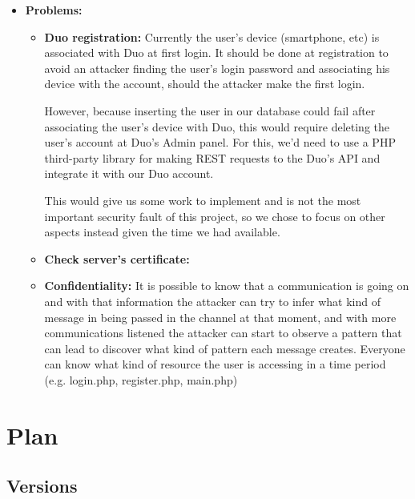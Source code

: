 \documentclass[12pt]{article}
\begin{document}
\begin{itemize}
  \item \textbf{Problems:}
    \begin{itemize}
        \item \textbf{Duo registration:}
        Currently the user's device (smartphone, etc) is associated with Duo at first login. It should be done at registration to avoid an attacker finding the user's login password and associating his device with the account, should the attacker make the first login.

        However, because inserting the user in our database could fail after associating the user's device with Duo, this would require deleting the user's account at Duo's Admin panel. For this, we'd need to use a PHP third-party library for making REST requests to the Duo's API and integrate it with our Duo account.

        This would give us some work to implement and is not the most important security fault of this project, so we chose to focus on other aspects instead given the time we had available.

        \item \textbf{Check server's certificate:}
        \item \textbf{Confidentiality:} 
        It is possible to know that a communication is going on and with that information the attacker can try to infer what kind of message in being passed in the channel at that moment, and with more communications listened the attacker can start to observe a pattern that can lead to discover what kind of pattern each message creates.
Everyone can know what kind of resource the user is accessing in a time period (e.g. login.php, register.php, main.php) 
    \end{itemize}
\end{itemize}


\newpage
\section{Plan}

\subsection{Versions}
\end{document}
